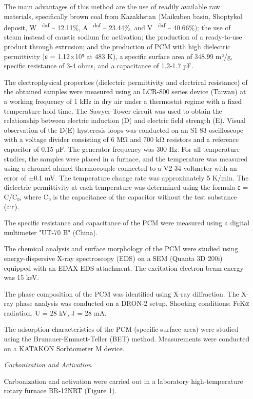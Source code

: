 \begin{multicols}{2}
The main advantages of this method are the use of readily available raw
materials, specifically brown coal from Kazakhstan (Maikuben basin,
Shoptykol deposit, W\_\textsuperscript{daf} -- 12.11\%,
A\_\textsuperscript{daf} -- 23.44\%, and V\_\textsuperscript{daf} --
40.66\%); the use of steam instead of caustic sodium for activation; the
production of a ready-to-use product through extrusion; and the
production of PCM with high dielectric permittivity (ε = 1.12×10⁹ at 483
K), a specific surface area of 348.99 m²/g, specific resistance of 3-4
ohms, and a capacitance of 1.2-1.7 µF.

The electrophysical properties (dielectric permittivity and electrical
resistance) of the obtained samples were measured using an LCR-800
series device (Taiwan) at a working frequency of 1 kHz in dry air under
a thermostat regime with a fixed temperature hold time. The Sawyer-Tower
circuit was used to obtain the relationship between electric induction
(D) and electric field strength (E). Visual observation of the D(E)
hysteresis loops was conducted on an S1-83 oscilloscope with a voltage
divider consisting of 6 MΩ and 700 kΩ resistors and a reference
capacitor of 0.15 µF. The generator frequency was 300 Hz. For all
temperature studies, the samples were placed in a furnace, and the
temperature was measured using a chromel-alumel thermocouple connected
to a V2-34 voltmeter with an error of ±0.1 mV. The temperature change
rate was approximately 5 K/min. The dielectric permittivity at each
temperature was determined using the formula ε = C/C₀, where C₀ is the
capacitance of the capacitor without the test substance (air).

The specific resistance and capacitance of the PCM were measured using a
digital multimeter "UT-70 B" (China).

The chemical analysis and surface morphology of the PCM were studied
using energy-dispersive X-ray spectroscopy (EDS) on a SEM (Quanta 3D
200i) equipped with an EDAX EDS attachment. The excitation electron beam
energy was 15 keV.

The phase composition of the PCM was identified using X-ray diffraction.
The X-ray phase analysis was conducted on a DRON-2 setup. Shooting
conditions: FeKα radiation, U = 28 kV, J = 28 mA.

The adsorption characteristics of the PCM (specific surface area) were
studied using the Brunauer-Emmett-Teller (BET) method. Measurements were
conducted on a KATAKON Sorbtometer M device.

\emph{Carbonization and Activation}

Carbonization and activation were carried out in a laboratory
high-temperature rotary furnace BR-12NRT (Figure 1).
\end{multicols}

